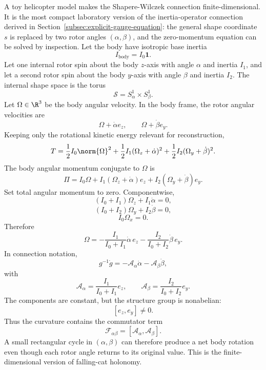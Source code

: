 A toy helicopter model makes the Shapere-Wilczek connection finite-dimensional.
It is the most compact laboratory version of the inertia-operator connection
derived in Section~\ref{subsec:explicit-gauge-equation}: the general shape
coordinate \(s\) is replaced by two rotor angles \((\alpha,\beta)\), and the
zero-momentum equation can be solved by inspection.
Let the body have isotropic base inertia
\[
  I_{\mathrm{body}}=I_0\mathbf 1.
\]
Let one internal rotor spin about the body \(z\)-axis with angle \(\alpha\) and
inertia \(I_1\), and let a second rotor spin about the body \(y\)-axis with
angle \(\beta\) and inertia \(I_2\). The internal shape space is the torus
\[
  \mathcal S=S^1_\alpha\times S^1_\beta.
\]
Let \(\Omega\in\R^3\) be the body angular velocity. In the body frame, the
rotor angular velocities are
\[
  \Omega+\dot\alpha e_z,
  \qquad
  \Omega+\dot\beta e_y.
\]
Keeping only the rotational kinetic energy relevant for reconstruction,
\[
  T=
  \frac12I_0\norm{\Omega}^2
  +
  \frac12I_1(\Omega_z+\dot\alpha)^2
  +
  \frac12I_2(\Omega_y+\dot\beta)^2.
\]
The body angular momentum conjugate to \(\Omega\) is
\[
  \Pi
  =
  I_0\Omega
  +
  I_1(\Omega_z+\dot\alpha)e_z
  +
  I_2(\Omega_y+\dot\beta)e_y.
\]
Set total angular momentum to zero. Componentwise,
\[
  (I_0+I_1)\Omega_z+I_1\dot\alpha=0,
\]
\[
  (I_0+I_2)\Omega_y+I_2\dot\beta=0,
\]
\[
  I_0\Omega_x=0.
\]
Therefore
\[
  \Omega
  =
  -\frac{I_1}{I_0+I_1}\dot\alpha\,e_z
  -
  \frac{I_2}{I_0+I_2}\dot\beta\,e_y.
\]
In connection notation,
\[
  g^{-1}\dot g
  =
  -\mathcal A_\alpha\dot\alpha-\mathcal A_\beta\dot\beta,
\]
with
\[
  \mathcal A_\alpha=
  \frac{I_1}{I_0+I_1}e_z,
  \qquad
  \mathcal A_\beta=
  \frac{I_2}{I_0+I_2}e_y.
\]
The components are constant, but the structure group is nonabelian:
\[
  [e_z,e_y]\neq0.
\]
Thus the curvature contains the commutator term
\[
  \mathcal F_{\alpha\beta}
  =
  [\mathcal A_\alpha,\mathcal A_\beta].
\]
A small rectangular cycle in \((\alpha,\beta)\) can therefore produce a net
body rotation even though each rotor angle returns to its original value. This
is the finite-dimensional version of falling-cat holonomy.

